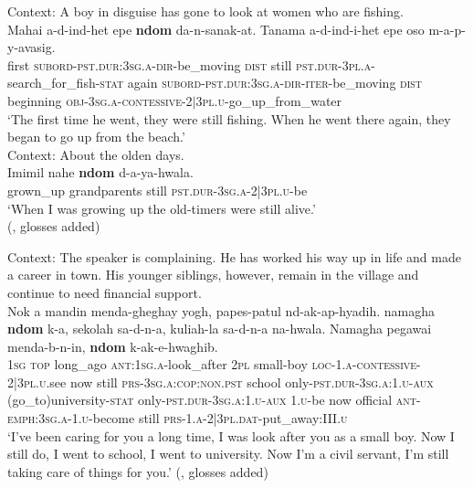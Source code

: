 \begin{exe}
	\ex\label{exAppendixCoastalMarind1}
	 Context: A boy in disguise has gone to look at women who are fishing.\\
	\gll Mahai a-d-ind-het epe \textbf{ndom} da-n-sanak-at. Tanama a-d-ind-i-het epe oso m-a-p-y-avasig.\\
	first \textsc{subord}-\textsc{pst}.\textsc{dur}:3\textsc{sg}.\textsc{a}-\textsc{dir}-be\_moving \textsc{dist} still \textsc{pst}.\textsc{dur}-3\textsc{pl}.\textsc{a}-search\_for\_fish-\textsc{stat} again \textsc{subord}-\textsc{pst}.\textsc{dur}:3\textsc{sg}.\textsc{a}-\textsc{dir}-\textsc{iter}-be\_moving \textsc{dist} beginning \textsc{obj}-3\textsc{sg}.\textsc{a}-\textsc{contessive}-2$|$3\textsc{pl}.\textsc{u}-go\_up\_from\_water\\
	\glt \lq The first time he went, they were still fishing. When he went there again, they began to go up from the beach.' \parencite[20]{Olsson2021a}\\

	\ex\label{exAppendixCoastalMarind2}
	Context: About the olden days.\\
	\gll Imimil nahe \textbf{ndom} d-a-ya-hwala.\\
	grown\_up grandparents still \textsc{pst}.\textsc{dur}-3\textsc{sg}.\textsc{a}-2|3\textsc{pl}.\textsc{u}-be\\
	\glt \lq When I was growing up the old-timers were still alive.'
	\\(\cite{Olsson2015}, glosses added)

	\ex\label{exAppendixCoastalMarind3}
	Context: The speaker is complaining. He has worked his way up in life and made a career in town. His younger siblings, however, remain in the village and continue to need financial support.\\
	\gll Nok a mandin menda-gheghay yogh, papes-patul nd-ak-ap-hyadih. namagha \textbf{ndom} k-a, sekolah sa-d-n-a, kuliah-la sa-d-n-a na-hwala. Namagha pegawai menda-b-n-in, \textbf{ndom} k-ak-e-hwaghib.\\
	1\textsc{sg} \textsc{top} long\_ago \textsc{ant}:1\textsc{sg}.\textsc{a}-look\_after 2\textsc{pl} small-boy \textsc{loc}-1.\textsc{a}-\textsc{contessive}-2|3\textsc{pl}.\textsc{u}.see now still \textsc{prs}-3\textsc{sg}.\textsc{a}:\textsc{cop}:\textsc{non}.\textsc{pst} school only-\textsc{pst}.\textsc{dur}-3\textsc{sg}.\textsc{a}:1.\textsc{u}-\textsc{aux} (go\_to)university-\textsc{stat} only-\textsc{pst}.\textsc{dur}-3\textsc{sg}.\textsc{a}:1.\textsc{u}-\textsc{aux} 1.\textsc{u}-be now official \textsc{ant}-\textsc{emph}:3\textsc{sg}.\textsc{a}-1.\textsc{u}-become still \textsc{prs}-1.\textsc{a}-2|3\textsc{pl}.\textsc{dat}-put\_away:III.\textsc{u}\\
	\glt \lq I've been caring for you a long time, I was look after you as a small boy. Now I still do, I went to school, I went to university. Now I'm a civil servant, I'm still taking care of things for you.' (\cite{Olsson2015}, glosses added)
\end{exe}

